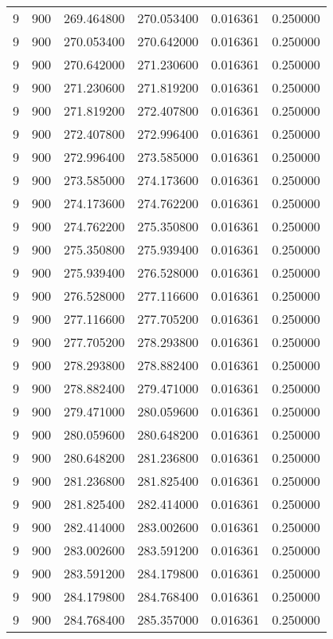 \begin{longtable}{rrrrrr}
9 & 900 & 269.464800 & 270.053400 & 0.016361 & 0.250000 \\
9 & 900 & 270.053400 & 270.642000 & 0.016361 & 0.250000 \\
9 & 900 & 270.642000 & 271.230600 & 0.016361 & 0.250000 \\
9 & 900 & 271.230600 & 271.819200 & 0.016361 & 0.250000 \\
9 & 900 & 271.819200 & 272.407800 & 0.016361 & 0.250000 \\
9 & 900 & 272.407800 & 272.996400 & 0.016361 & 0.250000 \\
9 & 900 & 272.996400 & 273.585000 & 0.016361 & 0.250000 \\
9 & 900 & 273.585000 & 274.173600 & 0.016361 & 0.250000 \\
9 & 900 & 274.173600 & 274.762200 & 0.016361 & 0.250000 \\
9 & 900 & 274.762200 & 275.350800 & 0.016361 & 0.250000 \\
9 & 900 & 275.350800 & 275.939400 & 0.016361 & 0.250000 \\
9 & 900 & 275.939400 & 276.528000 & 0.016361 & 0.250000 \\
9 & 900 & 276.528000 & 277.116600 & 0.016361 & 0.250000 \\
9 & 900 & 277.116600 & 277.705200 & 0.016361 & 0.250000 \\
9 & 900 & 277.705200 & 278.293800 & 0.016361 & 0.250000 \\
9 & 900 & 278.293800 & 278.882400 & 0.016361 & 0.250000 \\
9 & 900 & 278.882400 & 279.471000 & 0.016361 & 0.250000 \\
9 & 900 & 279.471000 & 280.059600 & 0.016361 & 0.250000 \\
9 & 900 & 280.059600 & 280.648200 & 0.016361 & 0.250000 \\
9 & 900 & 280.648200 & 281.236800 & 0.016361 & 0.250000 \\
9 & 900 & 281.236800 & 281.825400 & 0.016361 & 0.250000 \\
9 & 900 & 281.825400 & 282.414000 & 0.016361 & 0.250000 \\
9 & 900 & 282.414000 & 283.002600 & 0.016361 & 0.250000 \\
9 & 900 & 283.002600 & 283.591200 & 0.016361 & 0.250000 \\
9 & 900 & 283.591200 & 284.179800 & 0.016361 & 0.250000 \\
9 & 900 & 284.179800 & 284.768400 & 0.016361 & 0.250000 \\
9 & 900 & 284.768400 & 285.357000 & 0.016361 & 0.250000 \\

\end{longtable}

